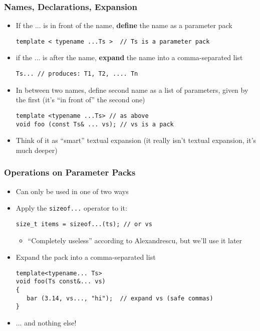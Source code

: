 \begin{frame}[fragile,t]
\frametitle{Names, Declarations, Expansion}
\begin{itemize}[<+->]
\item If the ... is in front of the name, {\bf define} the name as a parameter pack
{\scriptsize\begin{verbatim}
template < typename ...Ts >  // Ts is a parameter pack
\end{verbatim}
}
\item if the ... is after the name, {\bf expand} the name into a
  comma-separated list
{\scriptsize\begin{verbatim}
Ts... // produces: T1, T2, .... Tn
\end{verbatim}
}
\item In between two names, define second name as a list of
  parameters, given by the first (it's ``in front of'' the second one)
{\scriptsize\begin{verbatim}
template <typename ...Ts> // as above
void foo (const Ts& ... vs); // vs is a pack
\end{verbatim}
}
\item Think of it as ``smart'' textual expansion (it really isn't
  textual expansion, it's much deeper)
\end{itemize}

\end{frame}


\begin{frame}[fragile,t]
\frametitle{Operations on Parameter Packs}
\begin{itemize}[<+->]
\item Can only be used in one of two ways
\item Apply the  \texttt{sizeof...} operator to it:
{\scriptsize\begin{verbatim}
size_t items = sizeof...(ts); // or vs
\end{verbatim}
}
\begin{itemize}
  \item ``Completely useless'' according to Alexandrescu, but we'll
    use it later
\end{itemize}
\item Expand the pack into a comma-separated list
{\scriptsize\begin{verbatim}
template<typename... Ts>
void foo(Ts const&... vs)
{
   bar (3.14, vs..., "hi");  // expand vs (safe commas)
}
\end{verbatim}
}
\item ... and nothing else!
\end{itemize}
\end{frame}


